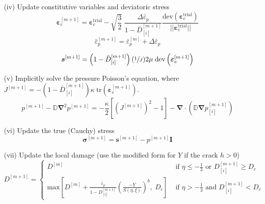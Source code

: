 \documentclass[sn-mathphys,Numbered,draft]{sn-jnl}%
\newcommand{\bb}{\boldsymbol}
\begin{document}
\begin{algorithm}[htbp]
(iv) Update constitutive variables and deviatoric stress
\begin{equation}
	\boldsymbol{\varepsilon}_{e}^{[m+1]}
	=
	\boldsymbol{\varepsilon}_{e}^{\text{trial}}
	- \sqrt{\frac{3}{2}} \; \frac{ \Delta\bar{\varepsilon}_p}{1 - \bar{D}^{[m+1]}_{[i]}}
	\frac{\text{dev}(\boldsymbol{\varepsilon}_{e}^{\text{trial}})}{||\boldsymbol{\varepsilon}_{e}^{\text{trial}}||}
	\nonumber
\end{equation}
\begin{equation}
	\bar{\varepsilon}_p^{[m+1]} = \bar{\varepsilon}_p^{[m]} + \Delta\bar{\varepsilon}_p \nonumber
\end{equation}

\begin{equation}
	\boldsymbol{s}^{[m+1]}
	=
	\left(1 - \bar{D}^{[m+1]}_{[i]}\right) (\sfrac{1}{J}) 2\mu \;\text{dev}\left(\boldsymbol{\varepsilon}_{e}^{[m+1]}\right) \nonumber
\end{equation}

(v) Implicitly solve the pressure Poisson's equation, where $J^{[m+1]} = -(1 - \bar{D}^{[m+1]}_{[i]}) \kappa \; \text{tr}\left(\boldsymbol{\varepsilon}_{e}^{[m+1]}\right)$.
\begin{equation}
	p^{[m+1]} - \mathbb{D} \bb{\nabla}^2 p^{[m+1]} = -\frac{\kappa}{2} \left[\left(J^{[m+1]}\right)^{2} - 1\right] - \bb{\nabla} \cdot \left( \mathbb{D} \bb{\nabla} p^{[m+1]}_{[i]} \right)
\end{equation}


(vi) Update the true (Cauchy) stress
\begin{equation}
	\boldsymbol{\sigma}^{[m+1]} = \boldsymbol{s}^{[m+1]} -  p^{[m+1]}\textbf{I} \nonumber
\end{equation}

(vii) Update the local damage (use the modified form for $Y$ if the crack $h > 0$)
\begin{equation} %
	D^{[m+1]} =
	\begin{cases}
		D^{[m]} & \text { if } \eta \leq -\frac{1}{3} \text{ or } D^{[m+1]}_{[i]} \geq D_c \\
		\text{max} \left[ D^{[m]} + \frac{\dot{\bar{\varepsilon}}_p}{1 - D^{[m+1]}_{[i]}}\left(\frac{-Y}{S(\eta,\xi)}\right)^b, \; D_c \right]
		& \text { if } \eta>-\frac{1}{3} \text{ and }  D^{[m+1]}_{[i]} < D_c
	\end{cases}
\end{equation}



\end{algorithm}
\end{document}
